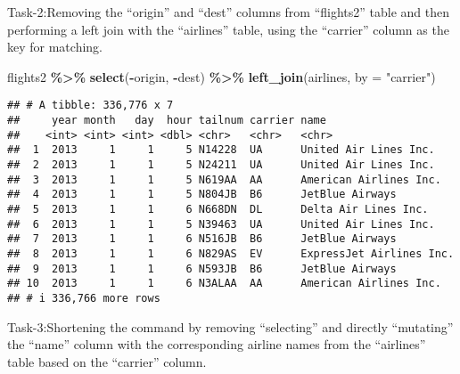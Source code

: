\documentclass[
]{article}
\newenvironment{Shaded}{\begin{snugshade}}{\end{snugshade}}
\newcommand{\AttributeTok}[1]{\textcolor[rgb]{0.13,0.29,0.53}{#1}}
\newcommand{\FunctionTok}[1]{\textcolor[rgb]{0.13,0.29,0.53}{\textbf{#1}}}
\newcommand{\NormalTok}[1]{#1}
\newcommand{\SpecialCharTok}[1]{\textcolor[rgb]{0.81,0.36,0.00}{\textbf{#1}}}
\newcommand{\StringTok}[1]{\textcolor[rgb]{0.31,0.60,0.02}{#1}}
\begin{document}
Task-2:Removing the ``origin'' and ``dest'' columns from ``flights2''
table and then performing a left join with the ``airlines'' table, using
the ``carrier'' column as the key for matching.

\begin{Shaded}
\begin{Highlighting}[]
\NormalTok{flights2 }\SpecialCharTok{\%\textgreater{}\%}
  \FunctionTok{select}\NormalTok{(}\SpecialCharTok{{-}}\NormalTok{origin, }\SpecialCharTok{{-}}\NormalTok{dest) }\SpecialCharTok{\%\textgreater{}\%} 
  \FunctionTok{left\_join}\NormalTok{(airlines, }\AttributeTok{by =} \StringTok{"carrier"}\NormalTok{)}
\end{Highlighting}
\end{Shaded}

\begin{verbatim}
## # A tibble: 336,776 x 7
##     year month   day  hour tailnum carrier name                    
##    <int> <int> <int> <dbl> <chr>   <chr>   <chr>                   
##  1  2013     1     1     5 N14228  UA      United Air Lines Inc.   
##  2  2013     1     1     5 N24211  UA      United Air Lines Inc.   
##  3  2013     1     1     5 N619AA  AA      American Airlines Inc.  
##  4  2013     1     1     5 N804JB  B6      JetBlue Airways         
##  5  2013     1     1     6 N668DN  DL      Delta Air Lines Inc.    
##  6  2013     1     1     5 N39463  UA      United Air Lines Inc.   
##  7  2013     1     1     6 N516JB  B6      JetBlue Airways         
##  8  2013     1     1     6 N829AS  EV      ExpressJet Airlines Inc.
##  9  2013     1     1     6 N593JB  B6      JetBlue Airways         
## 10  2013     1     1     6 N3ALAA  AA      American Airlines Inc.  
## # i 336,766 more rows
\end{verbatim}

Task-3:Shortening the command by removing ``selecting'' and directly
``mutating'' the ``name'' column with the corresponding airline names
from the ``airlines'' table based on the ``carrier'' column.

\begin{Shaded}
\end{Shaded}
\end{document}
